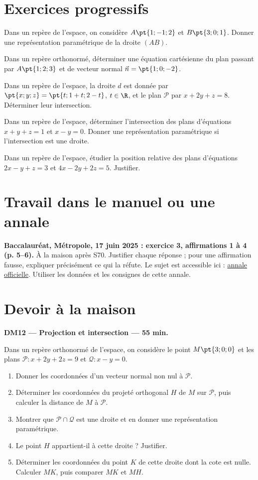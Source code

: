 \mxnewpage
\section{Exercices progressifs}

Dans un repère de l'espace, on considère $A\pt{1;-1;2}$ et $B\pt{3;0;1}$. Donner une représentation paramétrique de la droite $(AB)$.

Dans un repère orthonormé, déterminer une équation cartésienne du plan passant par $A\pt{1;2;3}$ et de vecteur normal $\vec n=\pt{1;0;-2}$.

Dans un repère de l'espace, la droite $d$ est donnée par $\pt{x;y;z}=\pt{t;1+t;2-t}$, $t\in\R$, et le plan $\mathcal P$ par $x+2y+z=8$. Déterminer leur intersection.

Dans un repère de l'espace, déterminer l'intersection des plans d'équations $x+y+z=1$ et $x-y=0$. Donner une représentation paramétrique si l'intersection est une droite.

Dans un repère de l'espace, étudier la position relative des plans d'équations $2x-y+z=3$ et $4x-2y+2z=5$. Justifier.

\section{Travail dans le manuel ou une annale}\textbf{Baccalauréat, Métropole, 17 juin 2025 : exercice 3, affirmations 1 à 4 (p. 5--6).} À la maison après S70. Justifier chaque réponse ; pour une affirmation fausse, expliquer précisément ce qui la réfute. Le sujet est accessible ici : \href{https://www.education.gouv.fr/sites/default/files/2025-06/baccalaur-at-g-n-ral-2025-math-matiques-440856.pdf}{annale officielle}. Utiliser les données et les consignes de cette annale.

\mxnewpage
\section{Devoir à la maison}\textbf{DM12 --- Projection et intersection --- 55 min.}\par Dans un repère orthonormé de l'espace, on considère le point $M\pt{3;0;0}$ et les plans $\mathcal P:x+2y+2z=9$ et $\mathcal Q:x-y=0$.
\begin{enumerate}\item Donner les coordonnées d'un vecteur normal non nul à $\mathcal P$.
\item Déterminer les coordonnées du projeté orthogonal $H$ de $M$ sur $\mathcal P$, puis calculer la distance de $M$ à $\mathcal P$.
\item Montrer que $\mathcal P\cap\mathcal Q$ est une droite et en donner une représentation paramétrique.
\item Le point $H$ appartient-il à cette droite ? Justifier.
\item Déterminer les coordonnées du point $K$ de cette droite dont la cote est nulle. Calculer $MK$, puis comparer $MK$ et $MH$.\end{enumerate}

